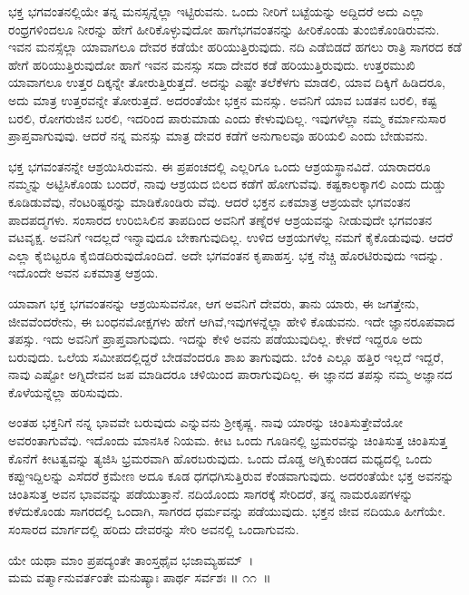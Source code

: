 ಭಕ್ತ ಭಗವಂತನಲ್ಲಿಯೇ ತನ್ನ ಮನಸ್ಸನ್ನೆಲ್ಲಾ ಇಟ್ಟಿರುವನು. ಒಂದು ನೀರಿಗೆ ಬಟ್ಟೆಯನ್ನು ಅದ್ದಿದರೆ ಅದು ಎಲ್ಲಾ ರಂಧ್ರಗಳಿಂದಲೂ ನೀರನ್ನು ಹೇಗೆ ಹೀರಿಕೊಳ್ಳುವುದೋ ಹಾಗೆ\break ಭಗವಂತನನ್ನು ಹೀರಿಕೊಂಡು ತುಂಬಿಕೊಂಡಿರುವನು. ಇವನ ಮನಸ್ಸೆಲ್ಲಾ ಯಾವಾಗಲೂ ದೇವರ ಕಡೆಯೇ ಹರಿಯುತ್ತಿರುವುದು. ನದಿ ಎಡೆಬಿಡದೆ ಹಗಲು ರಾತ್ರಿ ಸಾಗರದ ಕಡೆ ಹೇಗೆ ಹರಿಯುತ್ತಿರುವುದೋ ಹಾಗೆ ಇವನ ಮನಸ್ಸು ಸದಾ ದೇವರ ಕಡೆ ಹರಿಯುತ್ತಿರುವುದು. ಉತ್ತರಮುಖಿ ಯಾವಾಗಲೂ ಉತ್ತರ ದಿಕ್ಕನ್ನೇ ತೋರುತ್ತಿರುತ್ತದೆ. ಅದನ್ನು ಎಷ್ಟೇ ತಲೆಕೆಳಗು ಮಾಡಲಿ, ಯಾವ ದಿಕ್ಕಿಗೆ ಹಿಡಿದರೂ, ಅದು ಮಾತ್ರ ಉತ್ತರವನ್ನೇ ತೋರುತ್ತದೆ. ಅದರಂತೆಯೇ ಭಕ್ತನ ಮನಸ್ಸು. ಅವನಿಗೆ ಯಾವ ಬಡತನ ಬರಲಿ, ಕಷ್ಟ ಬರಲಿ, ರೋಗರುಜಿನ ಬರಲಿ, ಇದರಿಂದ ಪಾರುಮಾಡು ಎಂದು ಕೇಳುವುದಿಲ್ಲ. ಇವುಗಳೆಲ್ಲಾ ನಮ್ಮ ಕರ್ಮಾನುಸಾರ ಪ್ರಾಪ್ತವಾಗುವುವು. ಆದರೆ ನನ್ನ ಮನಸ್ಸು ಮಾತ್ರ ದೇವರ ಕಡೆಗೆ ಅನುಗಾಲವೂ ಹರಿಯಲಿ ಎಂದು ಬೇಡುವನು.

ಭಕ್ತ ಭಗವಂತನನ್ನೇ ಆಶ್ರಯಿಸಿರುವನು. ಈ ಪ್ರಪಂಚದಲ್ಲಿ ಎಲ್ಲರಿಗೂ ಒಂದು ಆಶ್ರಯಸ್ಥಾನವಿದೆ. ಯಾರಾದರೂ ನಮ್ಮನ್ನು ಅಟ್ಟಿಸಿಕೊಂಡು ಬಂದರೆ, ನಾವು ಆಶ್ರಯದ ಬಿಲದ ಕಡೆಗೆ ಹೋಗುವೆವು. ಕಷ್ಟಕಾಲಕ್ಕಾಗಲಿ ಎಂದು ದುಡ್ಡು ಕೂಡಿಡುವೆವು, ನೆಂಟರಿಷ್ಟರನ್ನು ಮಾಡಿಕೊಂಡಿರು ವೆವು. ಆದರೆ ಭಕ್ತನ ಏಕಮಾತ್ರ ಆಶ್ರಯವೇ ಭಗವಂತನ ಪಾದಪದ್ಮಗಳು. ಸಂಸಾರದ ಉರಿಬಿಸಿಲಿನ ತಾಪದಿಂದ ಅವನಿಗೆ ತಣ್ನೆರಳ ಆಶ್ರಯವನ್ನು ನೀಡುವುದೇ ಭಗವಂತನ ವಟವೃಕ್ಷ. ಅವನಿಗೆ ಇದಲ್ಲದೆ ಇನ್ನಾವುದೂ ಬೇಕಾಗುವುದಿಲ್ಲ. ಉಳಿದ ಆಶ್ರಯಗಳೆಲ್ಲ ನಮಗೆ ಕೈಕೊಡುವುವು. ಆದರೆ ಎಲ್ಲಾ ಕೈಬಿಟ್ಟರೂ ಕೈಬಿಡದಿರುವುದೊಂದಿದೆ. ಅದೇ ಭಗವಂತನ ಕೃಪಾಹಸ್ತ. ಭಕ್ತ ನೆಚ್ಚಿ ಹೊರಟಿರುವುದು ಇದನ್ನು. ಇದೊಂದೇ ಅವನ ಏಕಮಾತ್ರ ಆಶ್ರಯ.

ಯಾವಾಗ ಭಕ್ತ ಭಗವಂತನನ್ನು ಆಶ್ರಯಿಸುವನೋ, ಆಗ ಅವನಿಗೆ ದೇವರು, ತಾನು ಯಾರು, ಈ ಜಗತ್ತೇನು, ಜೀವವೆಂದರೇನು, ಈ ಬಂಧನಮೋಕ್ಷಗಳು ಹೇಗೆ ಆಗಿವೆ,ಇವುಗಳನ್ನೆಲ್ಲಾ ಹೇಳಿ ಕೊಡುವನು. ಇದೇ ಜ್ಞಾನರೂಪವಾದ ತಪಸ್ಸು. ಇದು ಅವನಿಗೆ ಪ್ರಾಪ್ತವಾಗುವುದು. ಇದನ್ನು ಕೇಳಿ ಅವನು ಪಡೆಯುವುದಿಲ್ಲ. ಕೇಳದೆ ಇದ್ದರೂ ಅದು ಬರುವುದು. ಒಲೆಯ ಸಮೀಪದಲ್ಲಿದ್ದರೆ ಬೇಡವೆಂದರೂ ಶಾಖ ತಾಗುವುದು. ಬೆಂಕಿ ಎಲ್ಲೂ ಹತ್ತಿರ ಇಲ್ಲದೆ ಇದ್ದರೆ, ನಾವು ಎಷ್ಟೋ ಅಗ್ನಿದೇವನ ಜಪ ಮಾಡಿದರೂ ಚಳಿಯಿಂದ ಪಾರಾಗುವುದಿಲ್ಲ. ಈ ಜ್ಞಾನದ ತಪಸ್ಸು ನಮ್ಮ ಅಜ್ಞಾನದ ಕೊಳೆಯನ್ನೆಲ್ಲಾ ಹರಿಸುವುದು.

ಅಂತಹ ಭಕ್ತನಿಗೆ ನನ್ನ ಭಾವವೇ ಬರುವುದು ಎನ್ನುವನು ಶ‍್ರೀಕೃಷ್ಣ. ನಾವು ಯಾರನ್ನು ಚಿಂತಿಸುತ್ತೇವೆಯೋ ಅವರಂತಾಗುವೆವು. ಇದೊಂದು ಮಾನಸಿಕ ನಿಯಮ. ಕೀಟ ಒಂದು ಗೂಡಿನಲ್ಲಿ ಭ್ರಮರವನ್ನು ಚಿಂತಿಸುತ್ತ ಚಿಂತಿಸುತ್ತ ಕೊನೆಗೆ ಕೀಟತ್ವವನ್ನು ತ್ಯಜಿಸಿ ಭ್ರಮರವಾಗಿ ಹೊರಬರುವುದು. ಒಂದು ದೊಡ್ಡ ಅಗ್ನಿಕುಂಡದ ಮಧ್ಯದಲ್ಲಿ ಒಂದು ಕಪ್ಪುಇದ್ದಿಲನ್ನು ಎಸೆದರೆ ಕ್ರಮೇಣ ಅದೂ ಕೂಡ ಧಗಧಗಿಸುತ್ತಿರುವ ಕೆಂಡವಾಗುವುದು. ಅದರಂತೆಯೇ ಭಕ್ತ ಅವನನ್ನು ಚಿಂತಿಸುತ್ತ ಅವನ ಭಾವವನ್ನು ಪಡೆಯುತ್ತಾನೆ. ನದಿಯೊಂದು ಸಾಗರಕ್ಕೆ ಸೇರಿದರೆ, ತನ್ನ ನಾಮರೂಪಗಳನ್ನು ಕಳೆದುಕೊಂಡು ಸಾಗರದಲ್ಲಿ ಒಂದಾಗಿ, ಸಾಗರದ ಧರ್ಮವನ್ನು ಪಡೆಯುವುದು. ಭಕ್ತನ ಜೀವ ನದಿಯೂ ಹೀಗೆಯೇ. ಸಂಸಾರದ ಮಾರ್ಗದಲ್ಲಿ ಹರಿದು ದೇವರನ್ನು ಸೇರಿ ಅವನಲ್ಲಿ ಒಂದಾಗುವನು.

\begin{shloka}
ಯೇ ಯಥಾ ಮಾಂ ಪ್ರಪದ್ಯಂತೇ ತಾಂಸ್ತಥೈವ ಭಜಾಮ್ಯಹಮ್~।\\ಮಮ ವರ್ತ್ಮಾನುವರ್ತಂತೇ ಮನುಷ್ಯಾಃ ಪಾರ್ಥ ಸರ್ವಶಃ \hfill॥ ೧೧~॥
\end{shloka}

